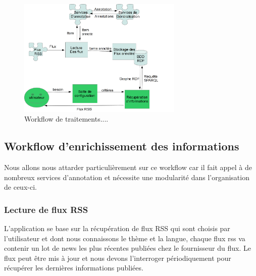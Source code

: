 \documentclass[]{easychair}
\begin{document}
\begin{figure}[htb!]
	\begin{centering}
	\includegraphics[width=0.7\textwidth]{diagramme-Archi.png}
	\caption{Workflow de traitements....}
	\label{fig:mmFM}
	\end{centering}
\end{figure}

\subsection{Workflow d'enrichissement des informations}
Nous allons nous attarder particulièrement sur ce workflow car il fait appel à de nombreux services d'annotation et nécessite une modularité dans l'organisation de ceux-ci.

\subsubsection{Lecture de flux RSS}
L'application se base sur la récupération de flux RSS qui sont choisis par l'utilisateur et dont nous connaissons le thème et la langue, chaque flux rss va contenir un lot de news les plus récentes publiées chez le fournisseur du flux. Le flux peut être mis à jour et nous devons l'interroger périodiquement pour récupérer les dernières informations publiées.
\end{document}

